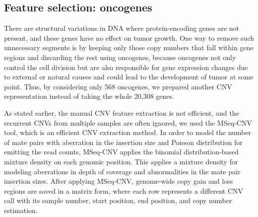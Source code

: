 \subsection{Feature selection: oncogenes}
There are structural variations in DNA where protein-encoding genes are not present, and these genes have no effect on tumor growth. One way to remove such unnecessary segments is by keeping only those copy numbers that fall within gene regions and discarding the rest using oncogenes, because oncogenes not only control the cell division but are also responsible for gene expression changes due to external or natural causes and could lead to the development of tumor at some point. Thus, by considering only 568 oncogenes, we prepared another CNV representation instead of taking the whole 20,308 genes. 

\hspace*{3.5mm} As stated earlier, the manual CNV feature extraction is not efficient, and the recurrent CNVs from multiple samples are often ignored, we used the MSeq-CNV tool, which is an efficient CNV extraction method. In order to model the number of mate pairs with aberration in the insertion size and Poisson distribution for emitting the read counts, MSeq-CNV applies the binomial distribution-based mixture density on each genomic position. This applies a mixture density for modeling aberrations in depth of coverage and abnormalities in the mate pair insertion sizes. After applying MSeq-CNV, genome-wide copy gain and loss regions are saved in a matrix form, where each row represents a different CNV call with its sample number, start position, end position, and copy number estimation.
 

